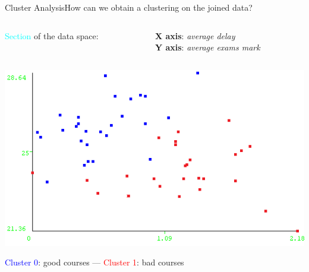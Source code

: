\begin{frame}{Cluster Analysis}{How can we obtain a clustering on the joined data?}

\vspace{0.2cm}
\begin{columns}
\begin{column}{0.5\textwidth}
   \textcolor{cyan}{Section} of the data space:
\end{column}
\begin{column}{0.5\textwidth}
     \textbf{X axis}: \emph{average delay} \\ \textbf{Y axis}: \emph{average exams mark}
\end{column}
\end{columns}

    \vspace{0.1cm}
    \begin{centering}
        \hspace{0.5cm}\includegraphics[scale=0.64]{cluster1.png}
    \end{centering}

    \textcolor{blue}{Cluster 0}: good courses --- \textcolor{red}{Cluster 1}: bad courses

\end{frame}

